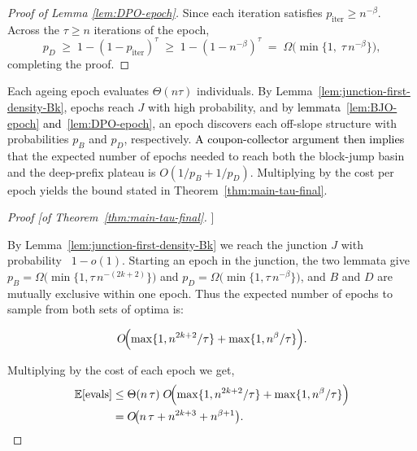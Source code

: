 \begin{proof}[Proof of Lemma \ref{lem:DPO-epoch}]
	Since each iteration satisfies \(p_{\text{iter}}\ge n^{-\beta}\).
	Across the \(\tau\ge n\) iterations of the epoch,
	\[
	p_D
	\;\ge\;
	1-(1-p_{\text{iter}})^{\tau}
	\;\ge\;
	1-(1-n^{-\beta})^\tau 
	\;=\;
	\Omega\!\bigl(\min\{1,\;\tau\,n^{-\beta}\}\bigr),
	\]
	completing the proof.
\end{proof}


Each ageing epoch evaluates $\Theta(n\tau)$ individuals.
By Lemma~\ref{lem:junction-first-density-Bk}, epochs reach $J$ with high probability, and by \textcolor{black}{lemmata~\ref{lem:BJO-epoch} and~\ref{lem:DPO-epoch}}, an epoch discovers each off-slope structure with probabilities $p_B$ and $p_D$, respectively.
\textcolor{black}{A coupon-collector argument then implies} that the expected number of epochs needed to reach both the block-jump basin and the deep-prefix plateau is $O(1/p_B + 1/p_D)$.
Multiplying by the cost per epoch yields the bound stated in Theorem~\ref{thm:main-tau-final}.

\begin{proof}[Proof [of Theorem~\ref{thm:main-tau-final}]]
	
	By Lemma~\ref{lem:junction-first-density-Bk} we reach the junction $J$ with probability \ \(1-o(1)\).
	Starting an epoch in the junction, %
	the two lemmata give
	$p_B=\Omega\!\bigl(\min\{1,\tau\,n^{-(2k+2)}\}\bigr)$ and
	$p_D=\Omega\!\bigl(\min\{1,\tau\,n^{-\beta}\}\bigr)$,
	and \(B\) and \(D\) are mutually exclusive within one epoch. Thus the expected number of epochs to sample from both sets of optima is:
	
	\[
	O\!\Bigl(
	\max\{1,n^{2k+2}/\tau\}
	+\max\{1,n^{\beta}/\tau\}
	\Bigr).
	\]
	
	Multiplying by the cost of each epoch we get,
	\begin{align*}
		\mathbb{E}[\text{evals}]
		&\le
		\Theta(n\,\tau)\;
		O\!\Bigl(
		\max\{1,n^{2k+2}/\tau\}
		+\max\{1,n^{\beta}/\tau\}
		\Bigr)
		\\&=
		O\!\bigl(
		n\,\tau
		+n^{2k+3}
		+n^{\beta+1}
		\bigr).
	\end{align*}
\end{proof}

